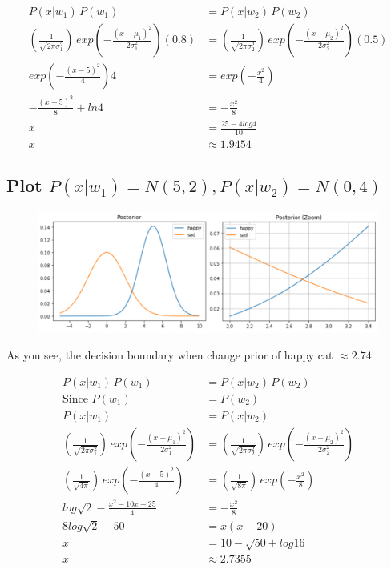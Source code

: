 \documentclass[12pt]{article}
\begin{document}
\begin{align*}
  P(x|w_1) \, P(w_1) &= P(x|w_2) \, P(w_2) \\
  (\frac{1}{\sqrt{2 \pi \sigma_1^2}}) \, exp (-\frac{(x-\mu_1)^2}{2 \sigma_1^2}) (0.8) &= (\frac{1}{\sqrt{2 \pi \sigma_2^2}}) \, exp (-\frac{(x-\mu_2)^2}{2 \sigma_2^2}) (0.5) \\
  exp (-\frac{(x-5)^2}{4}) 4 &= exp (-\frac{x^2}{4}) \\
  -\frac{(x - 5)^2}{8} + ln 4 &= -\frac{x^2}{8} \\
  x &= \frac{25 - 4 log 4}{10} \\
  x &\approx 1.9454
  \end{align*}

\subsection{Plot $P(x|w_1) = N(5,2), P(x|w_2) = N(0,4)$}

\begin{figure}[ht]
  \centering
  \includegraphics[width=1\textwidth]{bayes-3.png}
  \end{figure}

As you see, the decision boundary when change prior of happy cat $\approx 2.74$

\begin{align*}
  P(x|w_1) \, P(w_1) &= P(x|w_2) \, P(w_2) \\
  \text{Since } P(w_1) &= P(w_2) \\
  P(x|w_1) &= P(x|w_2) \\
  (\frac{1}{\sqrt{2 \pi \sigma_1^2}}) \, exp (-\frac{(x-\mu_1)^2}{2 \sigma_1^2}) &= (\frac{1}{\sqrt{2 \pi \sigma_2^2}}) \, exp (-\frac{(x-\mu_2)^2}{2 \sigma_2^2}) \\
  (\frac{1}{\sqrt{4 \pi}}) \, exp (-\frac{(x-5)^2}{4}) &= (\frac{1}{\sqrt{8 \pi}}) \, exp (-\frac{x^2}{8}) \\
  log\sqrt{2} - \frac{x^2 - 10x + 25}{4} &= -\frac{x^2}{8} \\
  8log\sqrt{2} - 50 &= x(x - 20) \\
  x &= 10 - \sqrt{50 + log16} \\
  x &\approx 2.7355
\end{align*}
\end{document}
